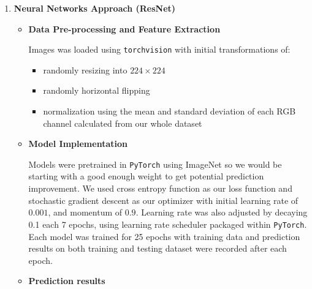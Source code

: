 \documentclass[11.5pt]{article}
\begin{document}
\begin{enumerate}
\begin{itemize}
            
        \end{itemize}
        \item \textbf{Neural Networks Approach (ResNet)}
        \begin{itemize}
            \item \textbf{Data Pre-processing and Feature Extraction}

            Images was loaded using \texttt{torchvision} with initial transformations of:
            \begin{itemize}
                \item randomly resizing into $224 \times 224$
                \item randomly horizontal flipping
                \item normalization using the mean and standard deviation of each RGB channel calculated from our whole dataset
            \end{itemize}

            \item \textbf{Model Implementation}

            Models were pretrained in \texttt{PyTorch}\cite{pytorch} using ImageNet so we would be starting with a good enough weight to get potential prediction improvement.
            We used cross entropy function as our loss function and stochastic gradient descent as our optimizer with initial learning rate of $0.001$, and momentum of $0.9$.
            Learning rate was also adjusted by decaying 0.1 each 7 epochs, using learning rate scheduler packaged within \texttt{PyTorch}\cite{pytorch}.
            Each model was trained for 25 epochs with training data and prediction results on both training and testing dataset were recorded after each epoch.
            \item \textbf{Prediction results}
            

\end{itemize}
\end{enumerate}
\end{document}
